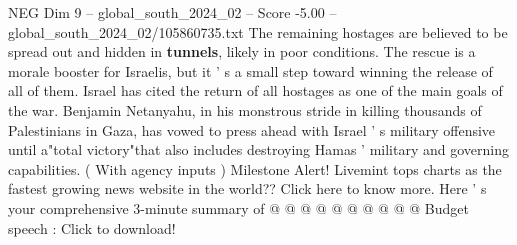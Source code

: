 \begin{textsample}{NEG Dim 9 – global\_south\_2024\_02 – Score -5.00 – global\_south\_2024\_02/105860735.txt}
The remaining hostages are believed to be spread out and hidden in \textbf{tunnels}, likely in poor conditions.
The rescue is a morale booster for Israelis, but it ' s a small step toward winning the release of all of them.
Israel has cited the return of all hostages as one of the main goals of the war.
Benjamin Netanyahu, in his monstrous stride in killing thousands of Palestinians in Gaza, has vowed to press ahead with Israel ' s military offensive until a"total victory"that also includes destroying Hamas ' military and governing capabilities. ( With agency inputs ) Milestone Alert!
Livemint tops charts as the fastest growing news website in the world??
Click here to know more.
Here ' s your comprehensive 3-minute summary of @ @ @ @ @ @ @ @ @ @ Budget speech : Click to download!

\end{textsample}
